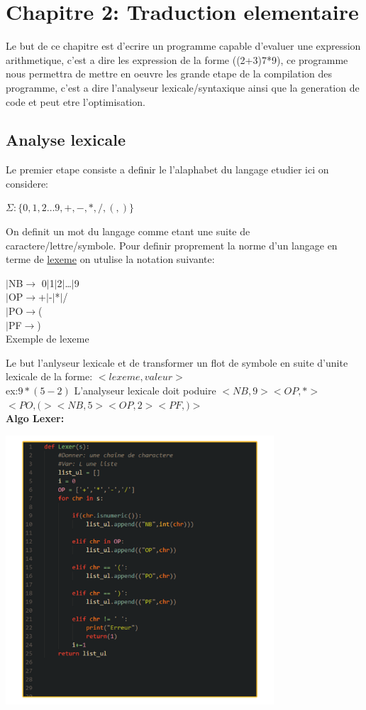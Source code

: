 \documentclass[a4paper,11pt]{article}
\begin{document}
  \section{\color{OrangeHaf}Chapitre 2: Traduction elementaire}
  Le but de ce chapitre est d'ecrire un programme capable d'evaluer une expression arithmetique, c'est a dire les expression de la forme ((2+3)7*9), ce programme nous permettra de mettre en oeuvre les grande etape de la compilation des programme, c'est a dire l'analyseur lexicale/syntaxique ainsi que la generation de code et peut etre l'optimisation.
  \subsection{Analyse lexicale}
      Le premier etape consiste a definir le l'alaphabet du langage etudier ici on considere:\\
      \begin{center}
        $\Sigma :\{0,1,2\ldots9,+,-,*,/,(,)\}$
      \end{center}
      On definit un mot du langage comme etant une suite de caractere/lettre/symbole. Pour definir proprement la norme d'un langage en terme de \underline{lexeme} on utulise la notation suivante:
      \begin{flushleft}
        $\vert$NB$\rightarrow$ 0$\vert$1$\vert$2$\vert$\ldots$\vert$9\\
        $\vert$OP$\rightarrow$+$\vert$-$\vert$*$\vert$/\\
        $\vert$PO$\rightarrow$(\\
        $\vert$PF$\rightarrow$)\\
        Exemple de lexeme
      \end{flushleft}
      Le but l'anlyseur lexicale et de transformer un flot de symbole en suite d'unite lexicale de la forme: $<lexeme,valeur>$\\
      ex:$9*(5-2)$
      L'analyseur lexicale doit poduire $<NB,9>$$<OP,*>$$<PO,(>$$<NB,5>$$<OP,2>$$<PF,)>$\\
      \textbf{Algo Lexer:}
      \begin{center}
     \hfill\includegraphics[width=10cm]{Lexer.png}\hspace*{\fill}
      \end{center}
\end{document}
